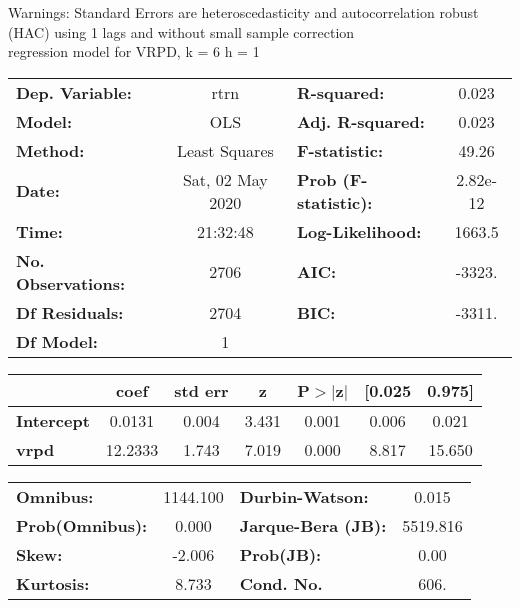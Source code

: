 Warnings: \newline
 [1] Standard Errors are heteroscedasticity and autocorrelation robust (HAC) using 1 lags and without small sample correction\\ 

regression model for VRPD, k = 6 h = 1\begin{center}
\begin{tabular}{lclc}
\toprule
\textbf{Dep. Variable:}    &       rtrn       & \textbf{  R-squared:         } &     0.023   \\
\textbf{Model:}            &       OLS        & \textbf{  Adj. R-squared:    } &     0.023   \\
\textbf{Method:}           &  Least Squares   & \textbf{  F-statistic:       } &     49.26   \\
\textbf{Date:}             & Sat, 02 May 2020 & \textbf{  Prob (F-statistic):} &  2.82e-12   \\
\textbf{Time:}             &     21:32:48     & \textbf{  Log-Likelihood:    } &    1663.5   \\
\textbf{No. Observations:} &        2706      & \textbf{  AIC:               } &    -3323.   \\
\textbf{Df Residuals:}     &        2704      & \textbf{  BIC:               } &    -3311.   \\
\textbf{Df Model:}         &           1      & \textbf{                     } &             \\
\bottomrule
\end{tabular}
\begin{tabular}{lcccccc}
                   & \textbf{coef} & \textbf{std err} & \textbf{z} & \textbf{P$> |$z$|$} & \textbf{[0.025} & \textbf{0.975]}  \\
\midrule
\textbf{Intercept} &       0.0131  &        0.004     &     3.431  &         0.001        &        0.006    &        0.021     \\
\textbf{vrpd}      &      12.2333  &        1.743     &     7.019  &         0.000        &        8.817    &       15.650     \\
\bottomrule
\end{tabular}
\begin{tabular}{lclc}
\textbf{Omnibus:}       & 1144.100 & \textbf{  Durbin-Watson:     } &    0.015  \\
\textbf{Prob(Omnibus):} &   0.000  & \textbf{  Jarque-Bera (JB):  } & 5519.816  \\
\textbf{Skew:}          &  -2.006  & \textbf{  Prob(JB):          } &     0.00  \\
\textbf{Kurtosis:}      &   8.733  & \textbf{  Cond. No.          } &     606.  \\
\bottomrule
\end{tabular}
\end{center}

